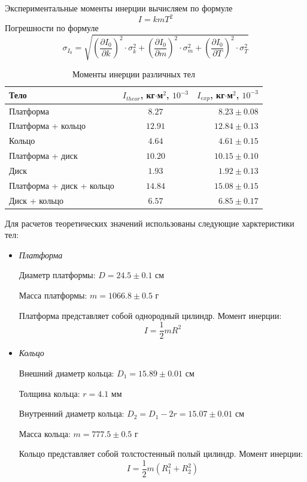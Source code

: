 \documentclass[a4paper,12pt]{article}
\begin{document}
\begin{enumerate}
	Экспериментальные моменты инерции вычисляем по формуле
	$$
	I = kmT^2
	$$
	Погрешности по формуле
	$$
	\sigma_{I_0} = \sqrt{\left(\frac{\partial{I_0}}{\partial{k}}\right)^2\cdot\sigma_k^2 + \left(\frac{\partial{I_0}}{\partial{m}}\right)^2\cdot \sigma_m^2 + \left(\frac{\partial{I_0}}{\partial{T}}\right)^2\cdot \sigma_T^2}
	$$
	\begin{table}[h!]
		\centering
		\begin{tabular}{|l|c|r|}
			\hline
			Тело & $I_{theor}$, кг$\cdot$м$^{2}$, $10^{-3}$ & $I_{exp}$, кг$\cdot$м$^{2}$, $10^{-3}$ \\ \hline
			Платформа & $8.27$ & $8.23\pm 0.08$ \\ \hline
			Платформа + кольцо & $12.91$ & $12.84\pm 0.13$ \\ \hline
			Кольцо & $4.64$ & $4.61\pm 0.15$ \\ \hline
			Платформа + диск & $10.20$ & $10.15\pm 0.10$ \\ \hline
			Диск & $1.93$ & $1.92\pm 0.13$ \\ \hline
			Платформа + диск + кольцо & $14.84$ & $15.08\pm 0.15$ \\ \hline
			Диск + кольцо & $6.57$ & $6.85\pm 0.17$ \\ \hline
		\end{tabular}
		\caption{Моменты инерции различных тел}
		\label{tab:moments}				
	\end{table}

	Для расчетов теоретических значений использованы следующие харктеристики тел:
	\begin{itemize}
		\item \textit{Платформа}

		Диаметр платформы: $D = 24.5\pm 0.1$ см

		Масса платформы: $m = 1066.8\pm 0.5$ г

		Платформа представляет собой однородный цилиндр. Момент инерции: $$I = \dfrac{1}{2}mR^2$$
		
		\item \textit{Кольцо}

		Внешний диаметр кольца: $D_1 = 15.89\pm 0.01$ см

		Толщина кольца: $r = 4.1$ мм 

		Внутренний диаметр кольца: $D_2 = D_1 - 2r = 15.07\pm0.01$ см

		Масса кольца: $m = 777.5\pm 0.5$ г

		Кольцо представляет собой толстостенный полый цилиндр. Момент инерции: $$I = \dfrac{1}{2}m(R_1^2+R_2^2)$$ 


\end{itemize}
\end{enumerate}
\end{document}
